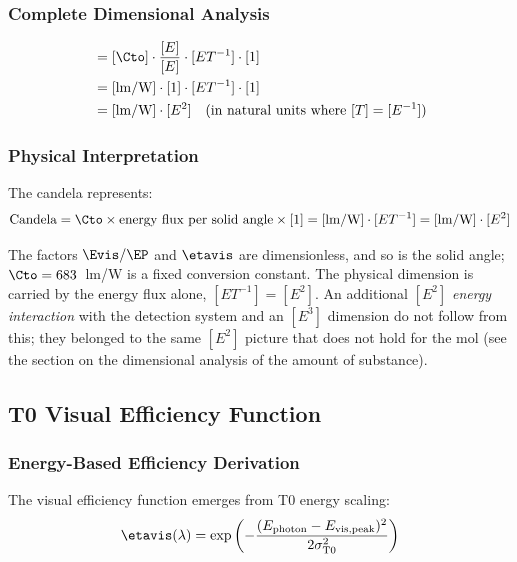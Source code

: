 	\subsubsection{Complete Dimensional Analysis}
	\label{subsubsec:candela_complete_dimensional}
	
	\begin{align}
		[I_{\text{T0}}] &= [\Cto] \cdot \frac{[E]}{[E]} \cdot [E T^{-1}] \cdot [1] \\
		&= [\text{lm/W}] \cdot [1] \cdot [E T^{-1}] \cdot [1] \\
		&= [\text{lm/W}] \cdot [E^2] \quad \text{(in natural units where } [T] = [E^{-1}])
		\label{eq:candela_dimensional_analysis}
	\end{align}
	
	\subsubsection{Physical Interpretation}
	\label{subsubsec:candela_physical_interpretation}
	
	The candela represents:
	\begin{equation}
		\text{Candela} = \Cto \times \text{energy flux per solid angle} \times [1] = [\text{lm/W}] \cdot [E T^{-1}] = [\text{lm/W}] \cdot [E^2]
		\label{eq:candela_interpretation}
	\end{equation}
	
	The factors $\Evis/\EP$ and $\etavis$ are dimensionless, and so is the solid angle; $\Cto = 683$~lm/W is a fixed conversion constant. The physical dimension is carried by the energy flux alone, $[E T^{-1}] = [E^2]$. An additional $[E^2]$ \emph{energy interaction} with the detection system and an $[E^3]$ dimension do not follow from this; they belonged to the same $[E^2]$ picture that does not hold for the mol (see the section on the dimensional analysis of the amount of substance).
	
	\subsection{T0 Visual Efficiency Function}
	\label{subsec:t0_visual_efficiency}
	
	\subsubsection{Energy-Based Efficiency Derivation}
	\label{subsubsec:energy_efficiency_derivation}
	
	The visual efficiency function emerges from T0 energy scaling:
	\begin{equation}
		\etavis(\lambda) = \exp\left(-\frac{(E_{\text{photon}} - E_{\text{vis,peak}})^2}{2\sigma_{\text{T0}}^2}\right)
		\label{eq:t0_visual_efficiency}
	\end{equation}
	
